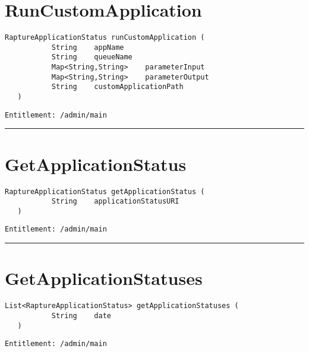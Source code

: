 \section{RunCustomApplication}
\label{Api:RunCustomApplication}
\begin{lstlisting}[style=nonumbers]
   RaptureApplicationStatus runCustomApplication (
           String    appName
           String    queueName
           Map<String,String>    parameterInput
           Map<String,String>    parameterOutput
           String    customApplicationPath
   )
\end{lstlisting}
\begin{Verbatim}[formatcom=\color{Maroon}]
  Entitlement: /admin/main
\end{Verbatim}



\rule{12cm}{2pt}
\section{GetApplicationStatus}
\label{Api:GetApplicationStatus}
\begin{lstlisting}[style=nonumbers]
   RaptureApplicationStatus getApplicationStatus (
           String    applicationStatusURI
   )
\end{lstlisting}
\begin{Verbatim}[formatcom=\color{Maroon}]
  Entitlement: /admin/main
\end{Verbatim}



\rule{12cm}{2pt}
\section{GetApplicationStatuses}
\label{Api:GetApplicationStatuses}
\begin{lstlisting}[style=nonumbers]
   List<RaptureApplicationStatus> getApplicationStatuses (
           String    date
   )
\end{lstlisting}
\begin{Verbatim}[formatcom=\color{Maroon}]
  Entitlement: /admin/main
\end{Verbatim}



